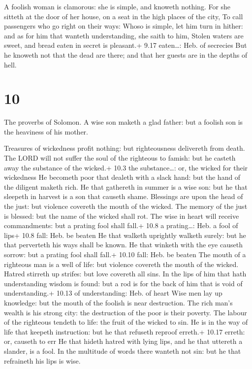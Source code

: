  A foolish woman is clamorous: she is simple, and knoweth
nothing.  For she sitteth at the door of her house, on a
seat in the high places of the city,  To call passengers
who go right on their ways:  Whoso is simple, let him turn
in hither: and as for him that wanteth understanding, she saith to him,
 Stolen waters are sweet, and bread eaten in secret is
pleasant.+ 9.17 eaten\ldots: Heb. of secrecies  But he
knoweth not that the dead are there; and that her guests are in the
depths of hell.

\hypertarget{section-9}{%
\section{10}\label{section-9}}

 The proverbs of Solomon. A wise son maketh a glad father:
but a foolish son is the heaviness of his mother.

 Treasures of wickedness profit nothing: but righteousness
delivereth from death.  The LORD will not suffer the soul of
the righteous to famish: but he casteth away the substance of the
wicked.+ 10.3 the substance\ldots: or, the wicked for their wickedness
 He becometh poor that dealeth with a slack hand: but the
hand of the diligent maketh rich.  He that gathereth in
summer is a wise son: but he that sleepeth in harvest is a son that
causeth shame.  Blessings are upon the head of the just: but
violence covereth the mouth of the wicked.  The memory of
the just is blessed: but the name of the wicked shall rot. 
The wise in heart will receive commandments: but a prating fool shall
fall.+ 10.8 a prating\ldots: Heb. a fool of lips+ 10.8 fall: Heb. be
beaten  He that walketh uprightly walketh surely: but he
that perverteth his ways shall be known.  He that winketh
with the eye causeth sorrow: but a prating fool shall fall.+ 10.10 fall:
Heb. be beaten  The mouth of a righteous man is a well of
life: but violence covereth the mouth of the wicked. 
Hatred stirreth up strifes: but love covereth all sins.  In
the lips of him that hath understanding wisdom is found: but a rod is
for the back of him that is void of understanding.+ 10.13 of
understanding: Heb. of heart  Wise men lay up knowledge:
but the mouth of the foolish is near destruction.  The rich
man's wealth is his strong city: the destruction of the poor is their
poverty.  The labour of the righteous tendeth to life: the
fruit of the wicked to sin.  He is in the way of life that
keepeth instruction: but he that refuseth reproof erreth.+ 10.17 erreth:
or, causeth to err  He that hideth hatred with lying lips,
and he that uttereth a slander, is a fool.  In the
multitude of words there wanteth not sin: but he that refraineth his
lips is wise.

